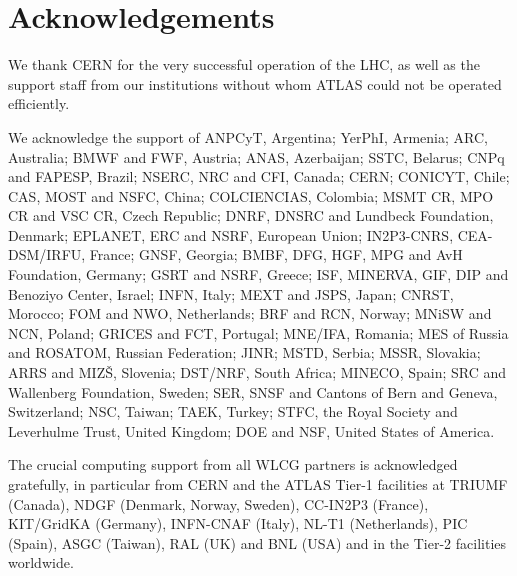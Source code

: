 \documentclass[11pt,a4paper,dvips]{article}
\begin{document}

\section{Acknowledgements}

We thank CERN for the very successful operation of the LHC, as well as the
support staff from our institutions without whom ATLAS could not be
operated efficiently.

We acknowledge the support of ANPCyT, Argentina; YerPhI, Armenia; ARC,
Australia; BMWF and FWF, Austria; ANAS, Azerbaijan; SSTC, Belarus; CNPq and FAPESP,
Brazil; NSERC, NRC and CFI, Canada; CERN; CONICYT, Chile; CAS, MOST and NSFC,
China; COLCIENCIAS, Colombia; MSMT CR, MPO CR and VSC CR, Czech Republic;
DNRF, DNSRC and Lundbeck Foundation, Denmark; EPLANET, ERC and NSRF, European Union;
IN2P3-CNRS, CEA-DSM/IRFU, France; GNSF, Georgia; BMBF, DFG, HGF, MPG and AvH
Foundation, Germany; GSRT and NSRF, Greece; ISF, MINERVA, GIF, DIP and Benoziyo Center,
Israel; INFN, Italy; MEXT and JSPS, Japan; CNRST, Morocco; FOM and NWO,
Netherlands; BRF and RCN, Norway; MNiSW and NCN, Poland; GRICES and FCT, Portugal; MNE/IFA, Romania; MES of Russia and ROSATOM, Russian Federation; JINR; MSTD,
Serbia; MSSR, Slovakia; ARRS and MIZ\v{S}, Slovenia; DST/NRF, South Africa;
MINECO, Spain; SRC and Wallenberg Foundation, Sweden; SER, SNSF and Cantons of
Bern and Geneva, Switzerland; NSC, Taiwan; TAEK, Turkey; STFC, the Royal
Society and Leverhulme Trust, United Kingdom; DOE and NSF, United States of
America.

The crucial computing support from all WLCG partners is acknowledged
gratefully, in particular from CERN and the ATLAS Tier-1 facilities at
TRIUMF (Canada), NDGF (Denmark, Norway, Sweden), CC-IN2P3 (France),
KIT/GridKA (Germany), INFN-CNAF (Italy), NL-T1 (Netherlands), PIC (Spain),
ASGC (Taiwan), RAL (UK) and BNL (USA) and in the Tier-2 facilities
worldwide.
\end{document}
